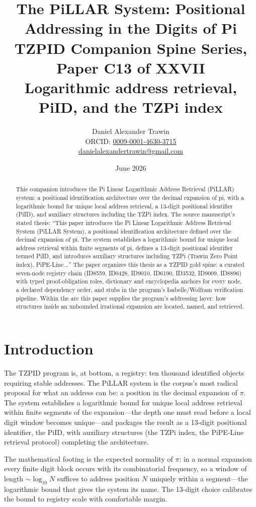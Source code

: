 \documentclass[11pt]{article}
\title{The PiLLAR System: Positional Addressing in the Digits of Pi\\[0.6em]
\large TZPID Companion Spine Series, Paper C13 of XXVII\\
\normalsize Logarithmic address retrieval, PiID, and the TZPi index}
\author{Daniel Alexander Trawin\\
\small ORCID: \href{https://orcid.org/0009-0001-4630-3715}{0009-0001-4630-3715}\\
\small \href{mailto:danielalexandertrawin@gmail.com}{danielalexandertrawin@gmail.com}}
\date{June 2026}
\theoremstyle{remark}
\begin{document}
\maketitle

\begin{abstract}
This companion introduces the Pi Linear Logarithmic Address Retrieval (PiLLAR) system: a positional identification architecture over the decimal expansion of pi, with a logarithmic bound for unique local address retrieval, a 13-digit positional identifier (PiID), and auxiliary structures including the TZPi index.
The source manuscript's stated thesis: ``This paper introduces the Pi Linear Logarithmic Address Retrieval System (PiLLAR System), a positional identification architecture defined over the decimal expansion of pi. The system establishes a logarithmic bound for unique local address retrieval within finite segments of pi, defines a 13-digit positional identifier termed PiID, and introduces auxiliary structures including TZPi (Trawin Zero Point index), PiPE-Line\,\ldots'' The paper organizes this thesis as a TZPID gold spine: a curated seven-node registry chain (ID8559, ID0428, ID9010, ID6190, ID3532, ID9009, ID8896) with typed proof-obligation roles, dictionary and encyclopedia anchors for every node, a declared dependency order, and stubs in the program's Isabelle/Wolfram verification pipeline. Within the arc this paper supplies the program's addressing layer: how structures inside an unbounded irrational expansion are located, named, and retrieved.
\end{abstract}

\section{Introduction}
\label{sec:intro}

The TZPID program is, at bottom, a registry: ten thousand identified objects requiring stable addresses. The PiLLAR system is the corpus's most radical proposal for what an address can be: a position in the decimal expansion of $\pi$. The system establishes a logarithmic bound for unique local address retrieval within finite segments of the expansion---the depth one must read before a local digit window becomes unique---and packages the result as a 13-digit positional identifier, the PiID, with auxiliary structures (the TZPi index, the PiPE-Line retrieval protocol) completing the architecture.

The mathematical footing is the expected normality of $\pi$: in a normal expansion every finite digit block occurs with its combinatorial frequency, so a window of length $\sim \log_{10} N$ suffices to address position $N$ uniquely within a segment---the logarithmic bound that gives the system its name. The 13-digit choice calibrates the bound to registry scale with comfortable margin.
\end{document}
